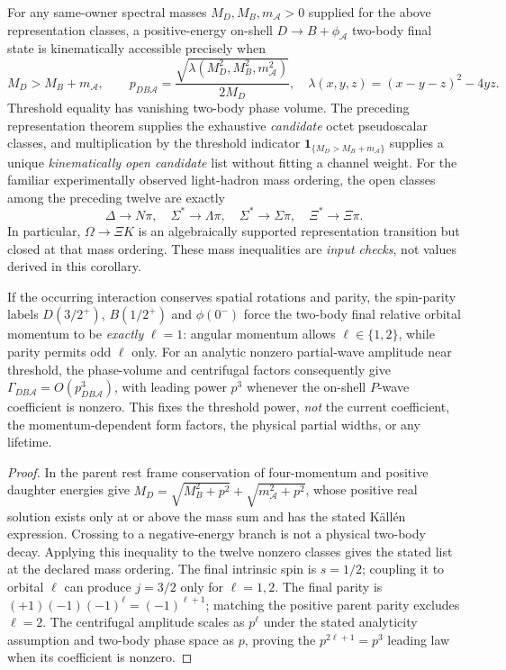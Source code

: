 \documentclass[12pt,a4paper]{article}
\begin{document}
\begin{corollary}
\label{p11:cor:v371-strong-decuplet-threshold-wave}
For any same-owner spectral masses $M_D,M_B,m_\mathcal A>0$ supplied
for the above representation classes, a positive-energy on-shell
$D\to B+\phi_\mathcal A$ two-body final state is kinematically
accessible precisely when
\[
 M_D> M_B+m_\mathcal A,\qquad
 p_{DB\mathcal A}=\frac{\sqrt{\lambda(M_D^2,M_B^2,m_\mathcal A^2)}}{2M_D},
 \quad \lambda(x,y,z)=(x-y-z)^2-4yz.
\]
Threshold equality has vanishing two-body phase volume. The preceding
representation theorem supplies the exhaustive \emph{candidate} octet
pseudoscalar classes, and multiplication by the threshold indicator
$\mathbf1_{\{M_D>M_B+m_\mathcal A\}}$ supplies a unique
\emph{kinematically open candidate} list without fitting a channel weight.
For the familiar experimentally observed light-hadron mass ordering,
the open classes among the preceding twelve are exactly
\[
 \boxed{\Delta\to N\pi,\quad
 \Sigma^*\to\Lambda\pi,\quad
 \Sigma^*\to\Sigma\pi,\quad
 \Xi^*\to\Xi\pi.}
\]
In particular, $\Omega\to\Xi K$ is an algebraically supported
representation transition but closed at that mass ordering. These
mass inequalities are \emph{input checks}, not values derived in
this corollary.

If the occurring interaction conserves spatial rotations and parity,
the spin-parity labels $D(3/2^+)$, $B(1/2^+)$ and
$\phi(0^-)$ force the two-body final relative orbital momentum to
be \emph{exactly} $\ell=1$: angular momentum allows $\ell\in\{1,2\}$,
while parity permits odd $\ell$ only. For an analytic nonzero
partial-wave amplitude near threshold, the phase-volume and
centrifugal factors consequently give $\Gamma_{DB\mathcal A}
=O(p_{DB\mathcal A}^{3})$, with leading power $p^3$ whenever the
on-shell $P$-wave coefficient is nonzero. This fixes the threshold
power, \emph{not} the current coefficient, the momentum-dependent
form factors, the physical partial widths, or any lifetime.
\end{corollary}
\begin{proof}
In the parent rest frame conservation of four-momentum and positive
daughter energies give $M_D=\sqrt{M_B^2+p^2}+\sqrt{m_\mathcal A^2+p^2}$,
whose positive real solution exists only at or above the mass sum and
has the stated K\"all\'en expression. Crossing to a negative-energy
branch is not a physical two-body decay. Applying this inequality to
the twelve nonzero classes gives the stated list at the declared mass
ordering. The final intrinsic spin is $s=1/2$; coupling it to orbital
$\ell$ can produce $j=3/2$ only for $\ell=1,2$. The final parity is
$(+1)(-1)(-1)^\ell=(-1)^{\ell+1}$; matching the positive parent
parity excludes $\ell=2$. The centrifugal amplitude scales as $p^\ell$
under the stated analyticity assumption and two-body phase space as
$p$, proving the $p^{2\ell+1}=p^3$ leading law when its coefficient
is nonzero.
\end{proof}
\end{document}

